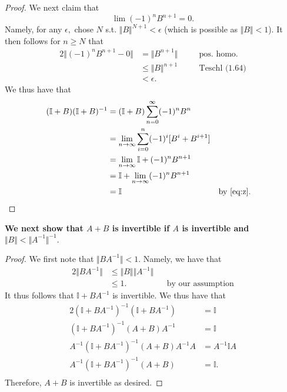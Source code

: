 \documentclass[10pt]{article}
\begin{document}
\begin{proof}
    We next claim that
    \begin{equation}\label{eq:z}
        \lim (-1)^n B^{n+1} = 0.
    \end{equation}
    Namely, for any $\epsilon,$ chose $N$ s.t. $\Vert B\Vert ^{N+1} < \epsilon$ (which is possible as $\Vert B\Vert < 1$). It then follows for $n \ge N$ that
    \begin{alignat*}{2}
        \Vert (-1)^n B^{n+1}-0\Vert &= \Vert B^{n+1}\Vert \quad&&\text{pos. homo.}\\
        &\le \Vert B \Vert^{n+1} &&\text{Teschl (1.64)}\\
        &< \epsilon.
    \end{alignat*}
    We thus have that
    \begin{alignat*}{2}
        (\mathbb{I} + B)(\mathbb{I}+B)^{-1} &= (\mathbb{I} + B) \sum_{n=0}^{\infty}(-1)^nB^n\\
        &= \lim_{n\to\infty} \sum_{i=0}^{n}(-1)^i[B^i + B^{i+1}]\\
        &= \lim_{n\to\infty} \mathbb{I} + (-1)^n B^{n+1}\\
        &= \mathbb{I} + \lim_{n\to\infty} (-1)^n B^{n+1}\\
        &= \mathbb{I} &&\text{by \eqref{eq:z}}.
    \end{alignat*}
\end{proof}



\noindent
\textbf{We next show that $A+B$ is invertible if $A$ is invertible and $\Vert B\Vert < \Vert A^{-1}\Vert^{-1}.$}

\begin{proof}
    We first note that $\Vert BA^{-1}\Vert < 1.$ Namely, we have that
    \begin{alignat*}{2}
         \Vert BA^{-1}\Vert &\le \Vert B\Vert \Vert A^{-1}\Vert\\
        &\le 1. \quad&&\text{by our assumption}
    \end{alignat*}
    It thus follows that $\mathbb{I} + BA^{-1}$ is invertible. We thus have that
    \begin{alignat*}{2}
        (\mathbb{I} + BA^{-1})^{-1}(\mathbb{I} + BA^{-1}) &= \mathbb{I}\\
        (\mathbb{I} + BA^{-1})^{-1}(A + B)A^{-1} &= \mathbb{I}\\
        A^{-1} (\mathbb{I} + BA^{-1})^{-1}(A + B)A^{-1}A &= A^{-1}\mathbb{I}A\\
        A^{-1} (\mathbb{I} + BA^{-1})^{-1}(A + B) &= \mathbb{I}.\\
    \end{alignat*}
    Therefore, $A+B$ is invertible as desired.
\end{proof}
\end{document}
